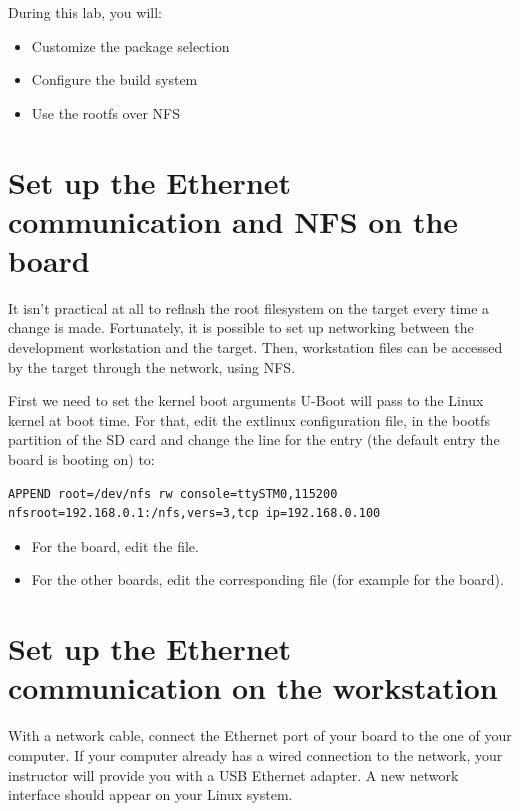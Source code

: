 
During this lab, you will:
\begin{itemize}
  \item Customize the package selection
  \item Configure the build system
  \item Use the rootfs over NFS
\end{itemize}

\section{Set up the Ethernet communication and NFS on the board}

It isn't practical at all to reflash the root filesystem on the target
every time a change is made. Fortunately, it is possible to set up
networking between the development workstation and the target. Then,
workstation files can be accessed by the target through the network,
using NFS.

First we need to set the kernel boot arguments U-Boot will pass to the
Linux kernel at boot time. For that, edit the extlinux configuration file, in
the bootfs partition of the SD card and change the  line for the
 entry (the default entry the board is booting on) to:

{\small
\begin{verbatim}
APPEND root=/dev/nfs rw console=ttySTM0,115200 nfsroot=192.168.0.1:/nfs,vers=3,tcp ip=192.168.0.100
\end{verbatim}
}

\begin{itemize}
  \item For the  board, edit the  file.
  \item For the other boards, edit the corresponding file (for example 
        for the  board).
\end{itemize}

\section{Set up the Ethernet communication on the workstation}

With a network cable, connect the Ethernet port of your board to the
one of your computer. If your computer already has a wired connection
to the network, your instructor will provide you with a USB Ethernet
adapter. A new network interface should appear on your Linux system.

